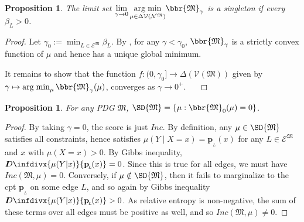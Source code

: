 \documentclass{article}
\theoremstyle{plain}
\newtheorem{prop}[theorem]{Proposition}
\theoremstyle{definition}
\theoremstyle{remark}
\newcommand{\thickD}{I\mkern-8muD}
\newcommand{\kldiv}{\thickD\infdivx}%
\DeclareMathOperator*{\argmin}{arg\;min}
\newcommand{\todo}[1]{{\color{red}\ \!\Large\smash{\textbf{[}}{\normalsize\textsc{todo:} #1}\ \!\smash{\textbf{]}}}}
\newcommand\mat[1]{\mathbf{#1}}
\newcommand{\bp}[1][L]{\mat{p}_{\!_{#1}\!}}
\newcommand{\V}{\mathcal V}
\newcommand{\N}{\mathcal N}
\newcommand{\Ed}{\mathcal E}
\newcommand{\dg}[1]{\mathfrak{#1}}
\newcommand\Inc{\mathit{Inc}}
\numberwithin{equation}{section}
\begin{document}
	\begin{prop}\label{prop:lim-exist}
		The limit set
		\(\displaystyle \smash{\lim_{\gamma\to0}\argmin_{\mu \in \Delta\V(\N^{\dg M})}}  \bbr{\dg M}_\gamma\)
		is a singleton if every $\beta_L > 0$.
	\end{prop}
	\begin{proof}
		Let $\gamma_0 := \min_{L \in \Ed^{\dg M}} \beta_L$.
		By , for any $\gamma < \gamma_0$, $\bbr{\dg M}_\gamma$ is a strictly convex function of $\mu$ and hence has a unique global minimum. 

		It remains to show that the function $f : (0, \gamma_0] \to \Delta(\V(\dg M))$ given by $\gamma \mapsto \argmin_{\mu} \bbr{\dg M}_\gamma(\mu)$, converges as $\gamma \to 0^+$.
		\todo{}

		
	\end{proof}

	\begin{prop}\label{prop:sd-is-zeroset}
		For any PDG $\dg M$, $\SD{\dg M} = \{ \mu : \bbr{\dg M}_0(\mu) = 0\}$.
	\end{prop}
	\begin{proof}
		 By taking $\gamma = 0$, the score is just $\Inc$. By  definition, any $\mu \in \SD{\dg M}$ satisfies all constraints, hence satisfies $\mu(Y \mid X=x) = \bp(x)$ for any $L \in \Ed^{\dg M}$ and $x$ with $\mu(X=x)>0$. By Gibbs inequality, $\kldiv{\mu(Y|x)}{\bp(x)} = 0$. Since this is true for all edges, we must have $\Inc(\dg M, \mu) = 0$. Conversely, if $\mu \notin \SD{\dg M}$, then it fails to marginalize to the cpt $\bp$ on some edge $L$, and so again by Gibbs inequality $\kldiv{\mu(Y|x)}{\bp(x)} > 0$. As relative entropy is non-negative, the sum of these terms over all edges must be positive as well, and so $\Inc(\dg M, \mu) \neq 0$. %
	\end{proof}
\end{document}

